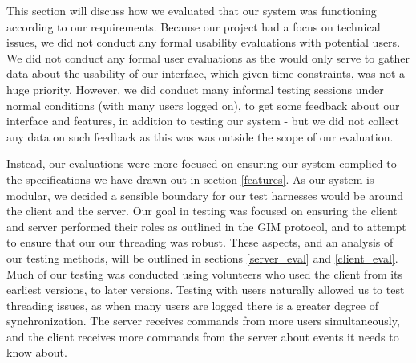 This section will discuss how we evaluated that our system was functioning according to our requirements. Because our project had a focus on technical issues, we did not conduct any formal usability evaluations with potential users. We did not conduct any formal user evaluations as the would only serve to gather data about the usability of our interface, which given time constraints, was not a huge priority. However, we did conduct many informal testing sessions under normal conditions (with many users logged on), to get some feedback about our interface and features, in addition to testing our system - but we did not collect any data on such feedback as this was was outside the scope of our evaluation. 

Instead, our evaluations were more focused on ensuring our system complied to the specifications we have drawn out in section \ref{features}. As our system is modular, we decided a sensible boundary for our test harnesses would be around the client and the server. Our goal in testing was focused on ensuring the client and server performed their roles as outlined in the GIM protocol, and to attempt to ensure that our our threading was robust.  These aspects, and an analysis of our testing methods, will be outlined in sections \ref{server_eval} and \ref{client_eval}. Much of our testing was conducted using volunteers who used the client from its earliest versions, to later versions. Testing with users naturally allowed us to test threading issues, as when many users are logged there is a greater degree of synchronization. The server receives commands from more users simultaneously, and the client receives more commands from the server about events it needs to know about.
